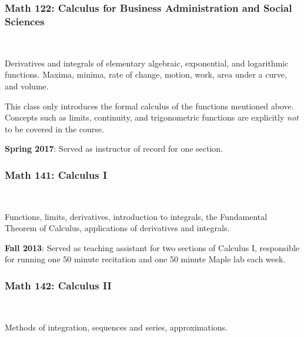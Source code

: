 \documentclass[teaching.portfolio.tex]{subfiles}
\begin{document}
\subsubsection{Math 122: Calculus for Business Administration and Social Sciences}\hfill\\
\begin{tcolorbox}
  \begin{desc}
    Derivatives and integrals of elementary algebraic, exponential, and logarithmic functions. Maxima, minima, rate of change, motion, work, area under a curve, and volume.
  \end{desc}
\end{tcolorbox}

\begin{rmk}
  This class only introduces the formal calculus of the functions mentioned above.
  Concepts such as limits, continuity, and trigonometric functions are explicitly \textit{not} to be covered in the course.
\end{rmk}
\noindent
\textbf{Spring 2017}: Served as instructor of record for one section.

\subsubsection{Math 141: Calculus I}\hfill\\
\begin{tcolorbox}
  \begin{desc}
    Functions, limits, derivatives, introduction to integrals, the Fundamental Theorem of Calculus, applications of derivatives and integrals.
  \end{desc}
\end{tcolorbox}

\noindent
\textbf{Fall 2013}: Served as teaching assistant for two sections of Calculus I, responsible for running one 50 minute recitation and one 50 minute Maple lab each week.

\subsubsection{Math 142: Calculus II}\hfill\\
\begin{tcolorbox}
  \begin{desc}
    Methods of integration, sequences and series, approximations.
  \end{desc}
  \end{tcolorbox}
\end{document}
